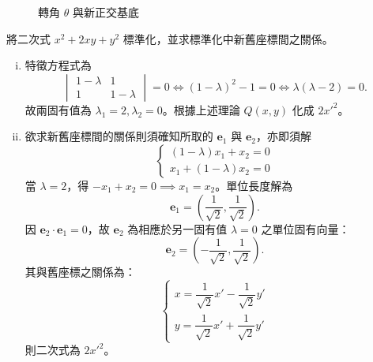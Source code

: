 \begin{figure}[htbp]
\centering
{}
\caption{轉角 $\theta$ 與新正交基底}
\label{fig:b4s-ch4-fig3-1}
\end{figure}

\begin{discussion}
將二次式 $x^2 + 2xy + y^2$ 標準化，並求標準化中新舊座標間之關係。
\end{discussion}

\begin{solution}
\begin{enumerate}[(i)]
  \item 特徵方程式為
  \[
  \begin{vmatrix} 1 - \lambda & 1 \\ 1 & 1 - \lambda \end{vmatrix} = 0 \iff (1 - \lambda)^2 - 1 = 0 \iff \lambda(\lambda - 2) = 0.
  \]
  故兩固有值為 $\lambda_1 = 2, \lambda_2 = 0$。根據上述理論 $Q(x, y)$ 化成 $2{x'}^2$。
  
  \item 欲求新舊座標間的關係則須確知所取的 $\mathbf{e}_1$ 與 $\mathbf{e}_2$，亦即須解
  \[
  \begin{cases}
  (1 - \lambda)x_1 + x_2 = 0 \\
  x_1 + (1 - \lambda)x_2 = 0
  \end{cases}
  \]
  當 $\lambda = 2$，得 $-x_1 + x_2 = 0 \implies x_1 = x_2$。單位長度解為
  \[
  \mathbf{e}_1 = \left( \frac{1}{\sqrt{2}}, \frac{1}{\sqrt{2}} \right).
  \]
  因 $\mathbf{e}_2 \cdot \mathbf{e}_1 = 0$，故 $\mathbf{e}_2$ 為相應於另一固有值 $\lambda = 0$ 之單位固有向量：
  \[
  \mathbf{e}_2 = \left( -\frac{1}{\sqrt{2}}, \frac{1}{\sqrt{2}} \right).
  \]
  其與舊座標之關係為：
  \[
  \begin{cases}
  x = \dfrac{1}{\sqrt{2}}x' - \dfrac{1}{\sqrt{2}}y' \\[0.5em]
  y = \dfrac{1}{\sqrt{2}}x' + \dfrac{1}{\sqrt{2}}y'
  \end{cases}
  \]
  則二次式為 $2{x'}^2$。
\end{enumerate}
\end{solution}

